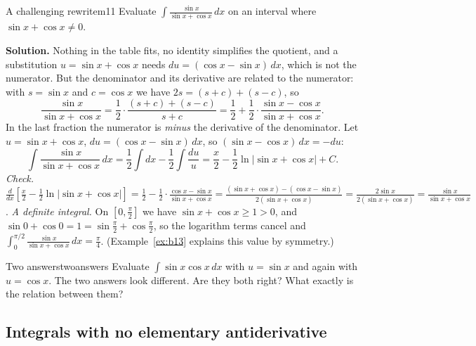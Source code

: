 \documentclass[11pt]{article}
\begin{document}
\begin{exmp}{A challenging rewrite}{m11}
Evaluate $\displaystyle\int\frac{\sin x}{\sin x+\cos x}\,dx$ on an interval where $\sin x+\cos x\ne0$.

\textbf{Solution.} Nothing in the table fits, no identity simplifies the quotient, and a substitution $u=\sin x+\cos x$ needs $du=(\cos x-\sin x)\,dx$, which is not the numerator. But the denominator and its derivative are related to the numerator: with $s=\sin x$ and $c=\cos x$ we have $2s=(s+c)+(s-c)$, so
\[\frac{\sin x}{\sin x+\cos x}=\frac12\cdot\frac{(s+c)+(s-c)}{s+c}=\frac12+\frac12\cdot\frac{\sin x-\cos x}{\sin x+\cos x}.\]
In the last fraction the numerator is \emph{minus} the derivative of the denominator. Let $u=\sin x+\cos x$, $du=(\cos x-\sin x)\,dx$, so $(\sin x-\cos x)\,dx=-du$:
\[\int\frac{\sin x}{\sin x+\cos x}\,dx=\frac12\int dx-\frac12\int\frac{du}u=\frac x2-\frac12\ln\lvert\sin x+\cos x\rvert+C .\]
\emph{Check.} $\frac d{dx}\left[\frac x2-\frac12\ln\lvert\sin x+\cos x\rvert\right]=\frac12-\frac12\cdot\frac{\cos x-\sin x}{\sin x+\cos x}=\frac{(\sin x+\cos x)-(\cos x-\sin x)}{2(\sin x+\cos x)}=\frac{2\sin x}{2(\sin x+\cos x)}=\frac{\sin x}{\sin x+\cos x}$.
\emph{A definite integral.} On $\left[0,\frac\pi2\right]$ we have $\sin x+\cos x\ge1>0$, and $\sin 0+\cos0=1=\sin\frac\pi2+\cos\frac\pi2$, so the logarithm terms cancel and $\int_0^{\pi/2}\frac{\sin x}{\sin x+\cos x}\,dx=\frac\pi4$. (Example~\ref{ex:b13} explains this value by symmetry.)
\end{exmp}

\begin{think}{Two answers}{twoanswers}
Evaluate $\int\sin x\cos x\,dx$ with $u=\sin x$ and again with $u=\cos x$. The two answers look different. Are they both right? What exactly is the relation between them?
\end{think}

\subsection*{Integrals with no elementary antiderivative}
\end{document}
